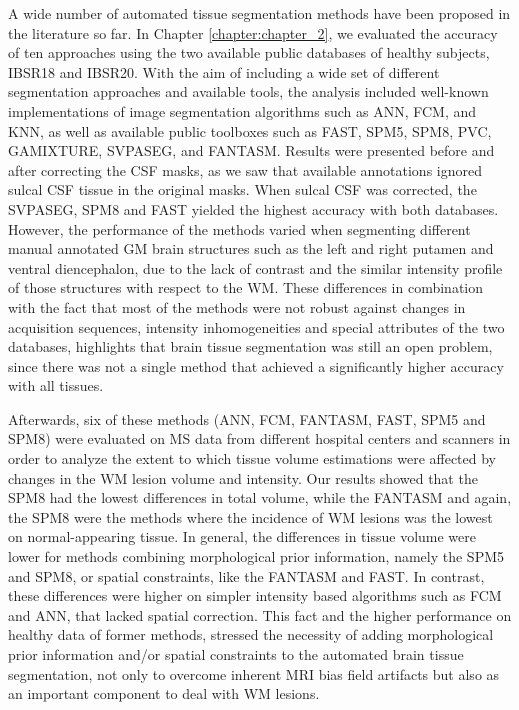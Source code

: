 A wide number of automated tissue segmentation methods have been proposed in the literature so far. In Chapter \ref{chapter:chapter_2}, we evaluated the accuracy of ten approaches using the two available public databases of healthy subjects, IBSR18 and IBSR20. With the aim of including a wide set of different segmentation approaches and available tools, the analysis included well-known implementations of image segmentation algorithms such as ANN, FCM, and KNN, as well as available public toolboxes such as FAST, SPM5, SPM8, PVC, GAMIXTURE, SVPASEG, and FANTASM. Results were presented before and after correcting the CSF masks, as we saw that available annotations ignored sulcal CSF tissue in the original masks. When sulcal CSF was corrected, the SVPASEG, SPM8 and FAST yielded the highest accuracy with both databases. 
However, the performance of the methods varied when segmenting different manual annotated GM brain structures such as the left and right putamen and ventral diencephalon, due to the lack of contrast and the similar intensity profile of those structures with respect to the WM. These differences in combination with the fact that most of the methods were not robust against changes in acquisition sequences, intensity inhomogeneities and special attributes of the two databases, highlights that brain tissue segmentation was still an open problem, since there was not a single method that achieved a significantly higher accuracy with all tissues. 

Afterwards, six of these methods (ANN, FCM, FANTASM, FAST, SPM5 and SPM8) were evaluated on MS data from different hospital centers and scanners in order to analyze the extent to which tissue volume estimations were affected by changes in the WM lesion volume and intensity. Our results showed that the SPM8 had the lowest differences in total volume, while the FANTASM and again, the SPM8 were the methods where the incidence of WM lesions was the lowest on normal-appearing tissue. In general, the differences in tissue volume were lower for methods combining morphological prior information, namely the SPM5 and SPM8, or spatial constraints, like the FANTASM and FAST. In contrast, these differences were higher on simpler intensity based algorithms such as FCM and ANN, that lacked spatial correction. This fact and the higher performance on healthy data of former methods, stressed the necessity of adding morphological prior information and/or spatial constraints to the automated brain tissue segmentation, not only to overcome inherent MRI bias field artifacts but also as an important component to deal with WM lesions.

